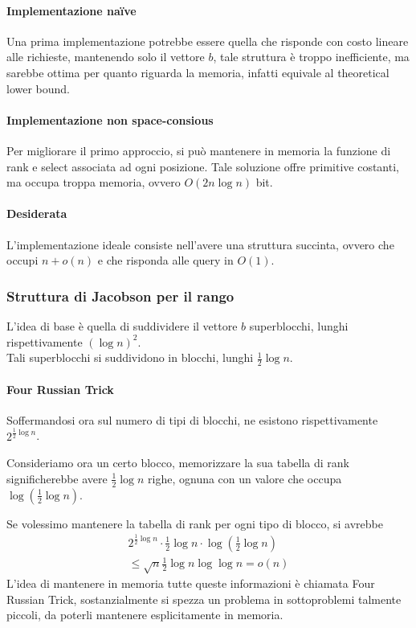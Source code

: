 \paragraph{Implementazione naïve}
Una prima implementazione potrebbe essere quella che risponde con costo lineare 
alle richieste, mantenendo solo il vettore $b$, tale struttura è troppo inefficiente, 
ma sarebbe ottima per quanto riguarda la memoria, infatti equivale al theoretical 
lower bound.

\paragraph{Implementazione non space-consious}
Per migliorare il primo approccio, si può mantenere in memoria la funzione di rank e select associata
ad ogni posizione.
Tale soluzione offre primitive costanti, ma occupa troppa memoria, 
ovvero $O(2n\log n)$ bit.

\paragraph{Desiderata}
L'implementazione ideale consiste nell'avere una struttura succinta, ovvero
che occupi $n + o(n)$ e che risponda alle query in $O(1)$.

\subsubsection{Struttura di Jacobson per il rango}
L'idea di base è quella di suddividere il vettore $b$ superblocchi, 
lunghi rispettivamente $(\log n )^2$.\\
Tali superblocchi si suddividono in blocchi, lunghi $\frac{1}{2}\log n$.

\paragraph{Four Russian Trick}
Soffermandosi ora sul numero di tipi di blocchi, ne esistono rispettivamente 
$2^{\frac{1}{2}\log n}$.

Consideriamo ora un certo blocco, memorizzare la sua tabella di rank
significherebbe avere $\frac{1}{2}\log n$ righe, ognuna con un valore 
che occupa $\log(\frac{1}{2}\log n)$.

Se volessimo mantenere la tabella di rank per ogni tipo di blocco, si avrebbe
\begin{equation}
    \begin{aligned}
        2^{\frac{1}{2}\log n} \cdot \frac{1}{2}\log n \cdot \log(\frac{1}{2}\log n)\\
        \leq \sqrt{n}\frac{1}{2}\log n \log \log n = o(n)
    \end{aligned}
\end{equation}
L'idea di mantenere in memoria tutte queste informazioni è chiamata Four Russian Trick, 
sostanzialmente si spezza un problema in sottoproblemi talmente piccoli, da poterli mantenere 
esplicitamente in memoria.


